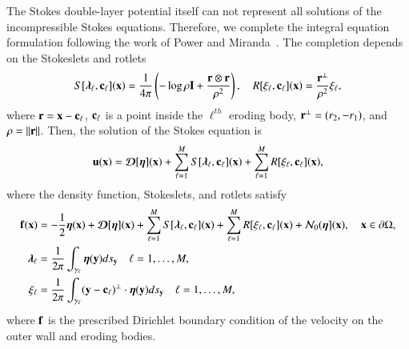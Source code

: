 \documentclass[preprint, 10pt]{elsarticle}
\begin{document}
The Stokes double-layer potential itself can not represent all solutions
of the incompressible Stokes equations.  Therefore, we complete the
integral equation formulation following the work of Power and
Miranda~\cite{pow-mir1987}.  The completion depends on the Stokeslets
and rotlets
\begin{align}
  S[{\boldsymbol\lambda}_\ell,{\mathbf{c}}_\ell]({\mathbf{x}}) = \frac{1}{4\pi} \left( 
    -\log \rho {\mathbf{I}} + \frac{{\mathbf{r}} \otimes {\mathbf{r}}}{\rho^2} \right), \quad
  R[\xi_\ell,{\mathbf{c}}_\ell]({\mathbf{x}}) = \frac{{\mathbf{r}}^\perp}{\rho^2} \xi_\ell,
\end{align}
where ${\mathbf{r}} = {\mathbf{x}} - {\mathbf{c}}_\ell$, ${\mathbf{c}}_\ell$ is a point inside the
$\ell^{th}$ eroding body, ${\mathbf{r}}^\perp = (r_2,-r_1)$, and $\rho =
\|{\mathbf{r}}\|$.  Then, the solution of the Stokes equation is
\begin{align}
  {\mathbf{u}}({\mathbf{x}}) = {\boldsymbol{\mathcal D}}[{\boldsymbol\eta}]({\mathbf{x}}) + 
    \sum_{\ell=1}^M S[{\boldsymbol\lambda}_\ell,{\mathbf{c}}_\ell]({\mathbf{x}}) + 
    \sum_{\ell=1}^M R[\xi_\ell,{\mathbf{c}}_\ell]({\mathbf{x}}),
\end{align}
where the density function, Stokeslets, and rotlets satisfy
\begin{align}
  {\mathbf{f}}({\mathbf{x}}) &= -\frac{1}{2}{\boldsymbol\eta}({\mathbf{x}}) + {\boldsymbol{\mathcal D}}[{\boldsymbol\eta}]({\mathbf{x}}) + 
    \sum_{\ell=1}^M S[{\boldsymbol\lambda}_\ell,{\mathbf{c}}_\ell]({\mathbf{x}}) + 
    \sum_{\ell=1}^M R[\xi_\ell,{\mathbf{c}}_\ell]({\mathbf{x}}) +
    {\mathcal{N}}_0({\boldsymbol\eta}]({\mathbf{x}}), \quad {\mathbf{x}} \in {\partial}\Omega, \\
  {\boldsymbol\lambda}_\ell &= \frac{1}{2\pi} \int_{\gamma_\ell} 
    {\boldsymbol\eta}({\mathbf{y}}) ds_{\mathbf{y}} \quad \ell = 1,\ldots,M, \\
  \xi_\ell &= \frac{1}{2\pi} \int_{\gamma_\ell}
    ({\mathbf{y}} - {\mathbf{c}}_\ell)^\perp \cdot {\boldsymbol\eta}({\mathbf{y}}) ds_{\mathbf{y}} 
    \quad \ell = 1,\ldots,M,
\end{align}
where ${\mathbf{f}}$ is the prescribed Dirichlet boundary condition of the
velocity on the outer wall and eroding bodies.

\end{document}

